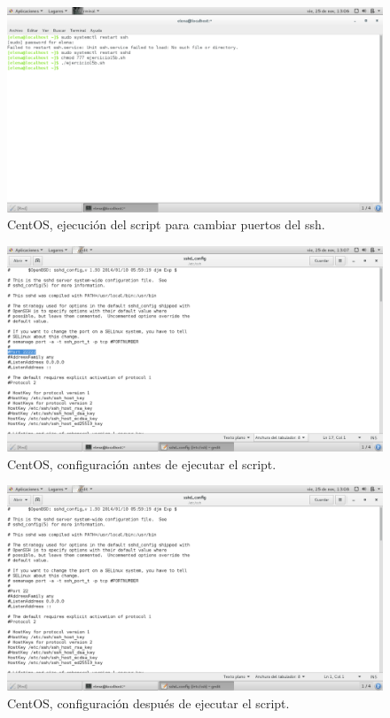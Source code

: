 \begin{figure}[H] 
	\centering
	\includegraphics[width=15cm]{./img/ejercicio15b_2.png} 	
	\caption{CentOS, ejecución del script para cambiar puertos del ssh.} \label{fig:ejercicio15b_2}
\end{figure}

\begin{figure}[H] 
	\centering
	\includegraphics[width=15cm]{./img/ejercicio15b_3.png} 	
	\caption{CentOS, configuración antes de ejecutar el script.} \label{fig:ejercicio15b_3}
\end{figure}

\begin{figure}[H] 
	\centering
	\includegraphics[width=15cm]{./img/ejercicio15b_4.png} 	
	\caption{CentOS, configuración después de ejecutar el script.} \label{fig:ejercicio15b_4}
\end{figure}

